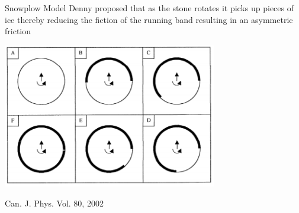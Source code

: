 \documentclass{beamer}
\begin{document}
\begin{frame}{Snowplow Model}
    Denny proposed that as the stone rotates it picks up pieces of ice thereby reducing the fiction of the running band resulting in an asymmetric friction
    \begin{center}
    \includegraphics[width=0.7\textwidth]{Images/Snowplow.png}

    \scriptsize{Can. J. Phys. Vol. 80, 2002}
    \end{center}
\end{frame}
\end{document}

